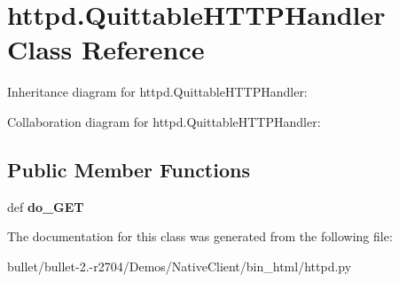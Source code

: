 \hypertarget{classhttpd_1_1_quittable_h_t_t_p_handler}{\section{httpd.\+Quittable\+H\+T\+T\+P\+Handler Class Reference}
\label{classhttpd_1_1_quittable_h_t_t_p_handler}
}


Inheritance diagram for httpd.\+Quittable\+H\+T\+T\+P\+Handler\+:


Collaboration diagram for httpd.\+Quittable\+H\+T\+T\+P\+Handler\+:
\subsection*{Public Member Functions}
\begin{DoxyCompactItemize}
\item 
\hypertarget{classhttpd_1_1_quittable_h_t_t_p_handler_a2e2835fbe5e1339e11f3185dde4a34f6}{def {\bfseries do\+\_\+\+G\+E\+T}}\label{classhttpd_1_1_quittable_h_t_t_p_handler_a2e2835fbe5e1339e11f3185dde4a34f6}

\end{DoxyCompactItemize}


The documentation for this class was generated from the following file\+:\begin{DoxyCompactItemize}
\item 
bullet/bullet-\/2.-\/r2704/\+Demos/\+Native\+Client/bin\+\_\+html/httpd.\+py\end{DoxyCompactItemize}
